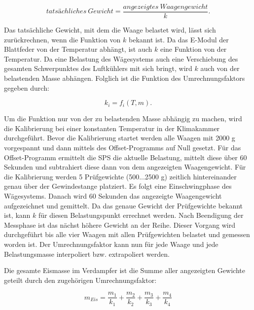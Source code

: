 \begin{equation}
tatsächliches ~Gewicht= \frac{angezeigtes~ Waagengewicht}{k}.
\label{eq:k}
\end{equation}

Das tatsächliche Gewicht, mit dem die Waage belastet wird, lässt sich zurückrechnen, wenn die Funktion von $k$ bekannt ist. 
Da das E-Modul der Blattfeder von der Temperatur abhängt, ist auch $k$ eine Funktion von der Temperatur. Da eine Belastung des Wägesystems auch eine Verschiebung des gesamten Schwerpunktes des Luftkühlers mit sich bringt, wird $k$ auch von der belastenden Masse abhängen. Folglich ist die Funktion des Umrechnungsfaktors gegeben durch: 

\begin{equation}
k_i = f_i(T,m). 
\end{equation}

Um die Funktion nur von der zu belastenden Masse abhängig zu machen, wird die Kalibrierung bei einer konstanten Temperatur in der Klimakammer durchgeführt. Bevor die Kalibrierung startet werden alle Waagen mit 2000 g vorgespannt und dann mittels des Offset-Programms auf Null gesetzt. Für das Offset-Programm ermittelt die SPS die aktuelle Belastung, mittelt diese über 60 Sekunden und subtrahiert diese dann von dem angezeigten Waagengewicht.
Für die Kalibrierung werden 5 Prüfgewichte (500...2500 g) zeitlich hintereinander genau über der Gewindestange platziert. Es folgt eine Einschwingphase des Wägesystems. Danach wird 60 Sekunden das angezeigte Waagengewicht aufgezeichnet und gemittelt. Da das genaue Gewicht der Prüfgewichte bekannt ist, kann $k$ für diesen Belastungspunkt errechnet werden. Nach Beendigung der Messphase ist das nächst höhere Gewicht an der Reihe. Dieser Vorgang wird durchgeführt bis alle vier Waagen mit allen Prüfgewichten belastet und gemessen worden ist. 
Der Umrechnungsfaktor kann nun für jede Waage und jede Belastungsmasse interpoliert bzw. extrapoliert werden.


Die gesamte Eismasse im Verdampfer ist die Summe aller angezeigten Gewichte geteilt durch den zugehörigen Umrechnungsfaktor:

\begin{equation}
m_{Eis}= \frac{m_1}{k_1}+ \frac{m_2}{k_2}+ \frac{m_3}{k_3}+\frac{m_4}{k_4}
\label{eq:Eismasse}
\end{equation}

